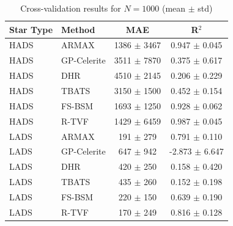 \begin{table}[h]
\centering
\caption{Cross-validation results for $N=1000$ (mean $\pm$ std)}
\label{tab:cv_results}
\begin{tabular}{llcc}
\toprule
Star Type & Method & MAE & R$^2$ \\
\midrule
HADS & ARMAX & 1386 $\pm$ 3467 & 0.947 $\pm$ 0.045 \\
HADS & GP-Celerite & 3511 $\pm$ 7870 & 0.375 $\pm$ 0.617 \\
HADS & DHR & 4510 $\pm$ 2145 & 0.206 $\pm$ 0.229 \\
HADS & TBATS & 3150 $\pm$ 1500 & 0.452 $\pm$ 0.154 \\
HADS & FS-BSM & 1693 $\pm$ 1250 & 0.928 $\pm$ 0.062 \\
HADS & R-TVF & 1429 $\pm$ 6459 & 0.987 $\pm$ 0.045 \\
\midrule
LADS & ARMAX & 191 $\pm$ 279 & 0.791 $\pm$ 0.110 \\
LADS & GP-Celerite & 647 $\pm$ 942 & -2.873 $\pm$ 6.647 \\
LADS & DHR & 420 $\pm$ 250 & 0.158 $\pm$ 0.420 \\
LADS & TBATS & 435 $\pm$ 260 & 0.152 $\pm$ 0.198 \\
LADS & FS-BSM & 220 $\pm$ 150 & 0.639 $\pm$ 0.190 \\
LADS & R-TVF & 170 $\pm$ 249 & 0.816 $\pm$ 0.128 \\
\bottomrule
\end{tabular}
\end{table}